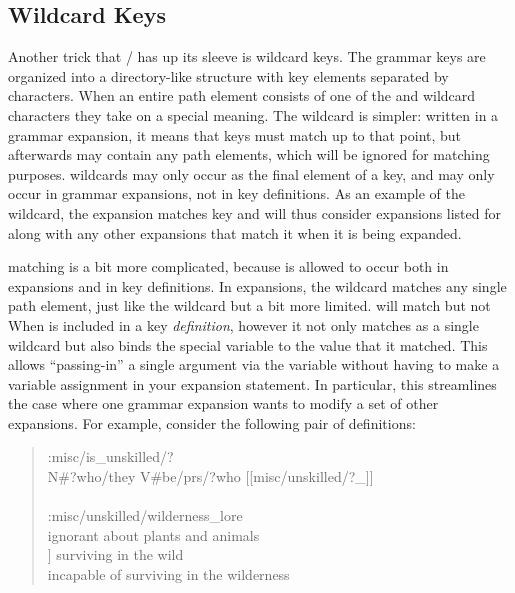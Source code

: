\subsection{Wildcard Keys}

Another trick that \dunyazad/ has up its sleeve is wildcard keys.
%
The grammar keys are organized into a directory-like structure with key elements separated by \exchar{/} characters.
%
When an entire path element consists of one of the  and \exchar{*} wildcard characters they take on a special meaning.
%
The \exchar{*} wildcard is simpler: written in a grammar expansion, it means that keys must match up to that point, but afterwards may contain any path elements, which will be ignored for matching purposes.
%
\exchar{*} wildcards may only occur as the final element of a key, and may only occur in grammar expansions, not in key definitions.
%
As an example of the \exchar{*} wildcard, the expansion  matches key  and will thus consider expansions listed for  along with any other expansions that match it when it is being expanded.


 matching is a bit more complicated, because  is allowed to occur both in expansions and in key definitions.
%
In expansions, the  wildcard matches any single path element, just like the \exchar{*} wildcard but a bit more limited.
%
 will match  but not 
%
When  is included in a key \emph{definition}, however it not only matches as a single wildcard but also binds the special variable \prq{\_}{} to the value that it matched.
%
This allows ``passing-in'' a single argument via the \prq{\_}{} variable without having to make a variable assignment in your expansion statement.
%
In particular, this streamlines the case where one grammar expansion wants to modify a set of other expansions.
%
For example, consider the following pair of definitions:

\begin{quote}
\ttfamily
:misc/is\_unskilled/? \\
N\#?who/they V\#be/prs/?who [[misc/unskilled/?\_]] \\
\\
:misc/unskilled/wilderness\_lore \\
ignorant about plants and animals \\ \relax
[[misc/bad\_at]] surviving in the wild \\
incapable of surviving in the wilderness
\end{quote}

